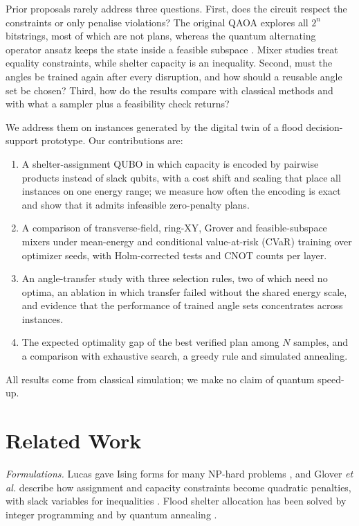 \documentclass[conference]{IEEEtran}
\begin{document}
Prior proposals rarely address three questions. First, does the circuit respect the constraints or only penalise violations? The original QAOA \cite{Farhi2014} explores all $2^n$ bitstrings, most of which are not plans, whereas the quantum alternating operator ansatz \cite{Hadfield2019} keeps the state inside a feasible subspace \cite{WangZ2020,Fuchs2022,Bartschi2020}. Mixer studies treat equality constraints, while shelter capacity is an inequality. Second, must the angles be trained again after every disruption, and how should a reusable angle set be chosen? Third, how do the results compare with classical methods and with what a sampler plus a feasibility check returns?

We address them on instances generated by the digital twin of a flood decision-support prototype. Our contributions are:
\begin{enumerate}
\item A shelter-assignment QUBO in which capacity is encoded by pairwise products instead of slack qubits, with a cost shift and scaling that place all instances on one energy range; we measure how often the encoding is exact and show that it admits infeasible zero-penalty plans.
\item A comparison of transverse-field, ring-XY, Grover and feasible-subspace mixers under mean-energy and conditional value-at-risk (CVaR) training over \NSeeds{} optimizer seeds, with Holm-corrected tests and CNOT counts per layer.
\item An angle-transfer study with three selection rules, two of which need no optima, an ablation in which transfer failed without the shared energy scale, and evidence that the performance of trained angle sets concentrates across instances.
\item The expected optimality gap of the best verified plan among $N$ samples, and a comparison with exhaustive search, a greedy rule and simulated annealing.
\end{enumerate}
All results come from classical simulation; we make no claim of quantum speed-up.

\section{Related Work}
\textit{Formulations.} Lucas gave Ising forms for many NP-hard problems \cite{Lucas2014}, and Glover \textit{et al.} describe how assignment and capacity constraints become quadratic penalties, with slack variables for inequalities \cite{Glover2019}. Flood shelter allocation has been solved by integer programming \cite{Sherali1991} and by quantum annealing \cite{Cadelina2024}.
\end{document}
